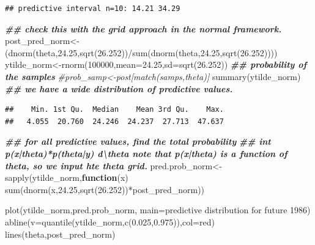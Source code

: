\documentclass[
]{book}
\newenvironment{Shaded}{\begin{snugshade}}{\end{snugshade}}
\newcommand{\AttributeTok}[1]{\textcolor[rgb]{0.77,0.63,0.00}{#1}}
\newcommand{\CommentTok}[1]{\textcolor[rgb]{0.56,0.35,0.01}{\textit{#1}}}
\newcommand{\ControlFlowTok}[1]{\textcolor[rgb]{0.13,0.29,0.53}{\textbf{#1}}}
\newcommand{\DecValTok}[1]{\textcolor[rgb]{0.00,0.00,0.81}{#1}}
\newcommand{\DocumentationTok}[1]{\textcolor[rgb]{0.56,0.35,0.01}{\textbf{\textit{#1}}}}
\newcommand{\FloatTok}[1]{\textcolor[rgb]{0.00,0.00,0.81}{#1}}
\newcommand{\FunctionTok}[1]{\textcolor[rgb]{0.00,0.00,0.00}{#1}}
\newcommand{\NormalTok}[1]{#1}
\newcommand{\OtherTok}[1]{\textcolor[rgb]{0.56,0.35,0.01}{#1}}
\newcommand{\SpecialCharTok}[1]{\textcolor[rgb]{0.00,0.00,0.00}{#1}}
\newcommand{\StringTok}[1]{\textcolor[rgb]{0.31,0.60,0.02}{#1}}
\theoremstyle{definition}
\theoremstyle{definition}
\theoremstyle{definition}
\theoremstyle{definition}
\theoremstyle{remark}
\begin{document}
\begin{verbatim}
## predictive interval n=10: 14.21 34.29
\end{verbatim}

\begin{Shaded}
\begin{Highlighting}[]
   \DocumentationTok{\#\# check this with the grid approach in the normal framework.  }
\NormalTok{  post\_pred\_norm}\OtherTok{\textless{}{-}}\NormalTok{(}\FunctionTok{dnorm}\NormalTok{(theta,}\FloatTok{24.25}\NormalTok{,}\FunctionTok{sqrt}\NormalTok{(}\FloatTok{26.252}\NormalTok{))}\SpecialCharTok{/}\FunctionTok{sum}\NormalTok{(}\FunctionTok{dnorm}\NormalTok{(theta,}\FloatTok{24.25}\NormalTok{,}\FunctionTok{sqrt}\NormalTok{(}\FloatTok{26.252}\NormalTok{))))}
\NormalTok{   ytilde\_norm}\OtherTok{\textless{}{-}}\FunctionTok{rnorm}\NormalTok{(}\DecValTok{100000}\NormalTok{,}\AttributeTok{mean=}\FloatTok{24.25}\NormalTok{,}\AttributeTok{sd=}\FunctionTok{sqrt}\NormalTok{(}\FloatTok{26.252}\NormalTok{)) }
 \DocumentationTok{\#\# probability of the samples }
 \CommentTok{\#prob\_samp\textless{}{-}post[match(samps,theta)]}
  \FunctionTok{summary}\NormalTok{(ytilde\_norm) }\DocumentationTok{\#\# we have a wide distribution of predictive values.}
\end{Highlighting}
\end{Shaded}

\begin{verbatim}
##    Min. 1st Qu.  Median    Mean 3rd Qu.    Max. 
##   4.055  20.760  24.246  24.237  27.713  47.637
\end{verbatim}

\begin{Shaded}
\begin{Highlighting}[]
\DocumentationTok{\#\# for all predictive values,  find the total probability  }
   \DocumentationTok{\#\# int p(x|theta)*p(theta|y) d\textbackslash{}theta  note that p(x|theta) is a function of theta, so we input hte theta grid.}
\NormalTok{ pred.prob\_norm}\OtherTok{\textless{}{-}}\FunctionTok{sapply}\NormalTok{(ytilde\_norm,}\ControlFlowTok{function}\NormalTok{(x) }\FunctionTok{sum}\NormalTok{(}\FunctionTok{dnorm}\NormalTok{(x,}\FloatTok{24.25}\NormalTok{,}\FunctionTok{sqrt}\NormalTok{(}\FloatTok{26.252}\NormalTok{))}\SpecialCharTok{*}\NormalTok{post\_pred\_norm))  }
  
 \FunctionTok{plot}\NormalTok{(ytilde\_norm,pred.prob\_norm, }\AttributeTok{main=}\StringTok{\textquotesingle{}predictive distribution for future 1986\textquotesingle{}}\NormalTok{)}
 \FunctionTok{abline}\NormalTok{(}\AttributeTok{v=}\FunctionTok{quantile}\NormalTok{(ytilde\_norm,}\FunctionTok{c}\NormalTok{(}\FloatTok{0.025}\NormalTok{,}\FloatTok{0.975}\NormalTok{)),}\AttributeTok{col=}\StringTok{\textquotesingle{}red\textquotesingle{}}\NormalTok{)}
 \FunctionTok{lines}\NormalTok{(theta,post\_pred\_norm)}
\end{Highlighting}
\end{Shaded}
\end{document}
